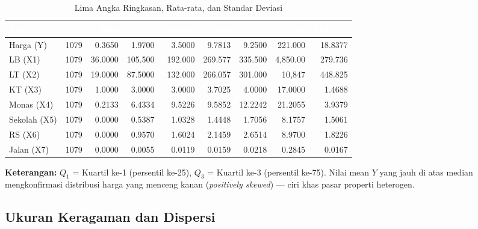 \documentclass[12pt,a4paper]{article}
\begin{document}
\begin{table}[H]
\centering
\caption{Lima Angka Ringkasan, Rata-rata, dan Standar Deviasi}
\label{tab:summary1}
\small
\setlength{\tabcolsep}{5.5pt}
\begin{tabular}{lrrrrrrrr}
\toprule
\rowcolor{headerblue}
\textcolor{white}{\textbf{Var}} &
\textcolor{white}{\textbf{$n$}} &
\textcolor{white}{\textbf{Min}} &
\textcolor{white}{\textbf{$Q_1$}} &
\textcolor{white}{\textbf{Median}} &
\textcolor{white}{\textbf{Mean}} &
\textcolor{white}{\textbf{$Q_3$}} &
\textcolor{white}{\textbf{Max}} &
\textcolor{white}{\textbf{Std.Dev}} \\
\midrule
\rowcolor{rowlight}
Harga (Y) & 1079 & 0.3650 & 1.9700 & 3.5000 & 9.7813 & 9.2500 & 221.000 & 18.8377 \\
LB (X1) & 1079 & 36.0000 & 105.500 & 192.000 & 269.577 & 335.500 & 4,850.00 & 279.736 \\
\rowcolor{rowlight}
LT (X2) & 1079 & 19.0000 & 87.5000 & 132.000 & 266.057 & 301.000 & 10,847 & 448.825 \\
KT (X3) & 1079 & 1.0000 & 3.0000 & 3.0000 & 3.7025 & 4.0000 & 17.0000 & 1.4688 \\
\rowcolor{rowlight}
Monas (X4) & 1079 & 0.2133 & 6.4334 & 9.5226 & 9.5852 & 12.2242 & 21.2055 & 3.9379 \\
Sekolah (X5) & 1079 & 0.0000 & 0.5387 & 1.0328 & 1.4448 & 1.7056 & 8.1757 & 1.5061 \\
\rowcolor{rowlight}
RS (X6) & 1079 & 0.0000 & 0.9570 & 1.6024 & 2.1459 & 2.6514 & 8.9700 & 1.8226 \\
Jalan (X7) & 1079 & 0.0000 & 0.0055 & 0.0119 & 0.0159 & 0.0218 & 0.2845 & 0.0167 \\
\bottomrule
\end{tabular}
\end{table}

\noindent\textbf{Keterangan:} $Q_1$ = Kuartil ke-1 (persentil ke-25),
$Q_3$ = Kuartil ke-3 (persentil ke-75).
Nilai mean $Y$ yang jauh di atas median mengkonfirmasi distribusi harga yang menceng
kanan (\textit{positively skewed}) --- ciri khas pasar properti heterogen.

\subsection{Ukuran Keragaman dan Dispersi}
\end{document}
